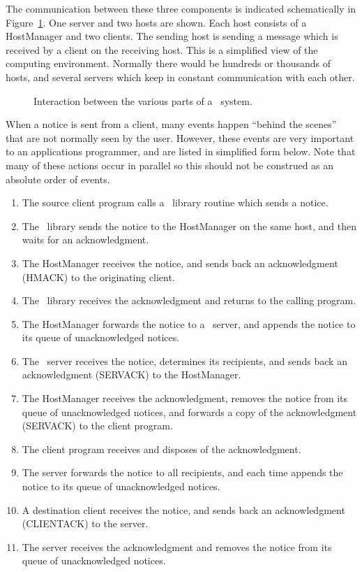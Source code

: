 The communication between these three components is indicated
schematically in Figure~\ref{fig:zephyr-interaction}.  One server and
two hosts are shown.  Each host consists of a HostManager and two
clients.  The sending host is sending a message which is received by a
client on the receiving host.  This is a simplified
view of the computing environment.  Normally there would be hundreds
or thousands of hosts, and several servers which keep in constant
communication with each other.

\begin{figure}

\caption{Interaction between the various parts of a \Zephyr\ system.}
\label{fig:zephyr-interaction}
\end{figure}

When a notice is sent from a client, many events happen ``behind the
scenes'' that are not normally seen by the user.  However, these
events are very important to an applications programmer, and are listed
in simplified form below.  Note that many of these actions occur in
parallel so this should not be construed as an absolute order of events.

\begin{enumerate}
\item The source client program calls a \Zephyr\ library routine which
sends a notice.
\item The \Zephyr\ library sends the notice to the HostManager on the
same host, and then waits for an acknowledgment.
\item The HostManager receives the notice, and sends back an
acknowledgment (HMACK) to the originating client.
\item The \Zephyr\ library receives the acknowledgment and returns to
the calling program.
\item The HostManager forwards the notice to a \Zephyr\ server, and
appends the notice to its queue of unacknowledged notices.
\item The \Zephyr\ server receives the notice, determines its
recipients, and sends back an acknowledgment (SERVACK) to the HostManager.
\item The HostManager receives the acknowledgment, removes the notice
from its queue of unacknowledged notices, and forwards a copy of the
acknowledgment (SERVACK) to the client program.
\item The client program receives and disposes of the acknowledgment.
\item The server forwards the notice to all recipients, and
each time appends the notice to its queue of unacknowledged notices.
\item A destination client receives the notice, and sends back an
acknowledgment (CLIENTACK) to the server.
\item The server receives the acknowledgment and removes the notice
from its queue of unacknowledged notices.
\end{enumerate}


